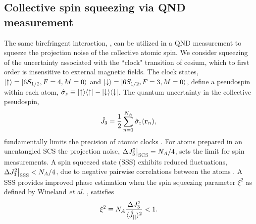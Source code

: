 \documentclass[preprint,aps,pra,onecolumn]{revtex4-1} %
\newcommand{\scs}{{\rm SCS}}
\begin{document}
	\subsection{Collective spin squeezing via QND measurement}

The same birefringent interaction, , can be utilized in a QND measurement to squeeze the projection noise of the collective atomic spin.  We consider squeezing of the uncertainty associated with the ``clock" transition of cesium, which to first order is insensitive to external magnetic fields.  The clock states, $\lvert{\uparrow}\rangle = \lvert{6S_{1/2}, F=4, M=0}\rangle$ and $\lvert{\downarrow}\rangle = \lvert{6S_{1/2}, F=3, M=0}\rangle$, define a pseudospin within each atom, $\hat{\sigma}_z \equiv \lvert{\uparrow}\rangle\langle{\uparrow}\rvert - \lvert{\downarrow}\rangle\langle{\downarrow}\rvert$.  The quantum uncertainty in the collective pseudospin,
	\begin{align}
		\hat{J}_3 = \frac{1}{2} \sum_{n=1}^{N_A} \hat{\sigma}_z(\mathbf{r}_n),  
	\end{align}
fundamentally limits the precision of atomic clocks \cite{wineland_spin_1992}. For atoms prepared in an unentangled SCS the projection noise, $\Delta J_3^2 \big|_{\scs} = N_A/4$, sets the limit for spin measurements. A spin squeezed state (SSS) exhibits reduced fluctuations, $ \Delta J_3^2 \big|_{\rm SSS}  < N_A/4$, due to negative pairwise correlations between the atoms \cite{norris_enhanced_2012}. A SSS provides improved phase estimation when the spin squeezing parameter $\xi^2$ as defined by Wineland \emph{et al.} \cite{wineland_spin_1992}, satisfies
	\begin{align} \label{Eq::SqueezingParameter}
		\xi^2 \equiv N_A \frac{ \Delta J_3^2 }{ \langle{\hat{J}_{||}}\rangle^2 } < 1.
	\end{align}
\end{document}
